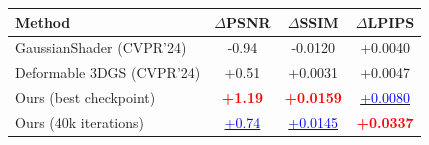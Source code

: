 \newcommand{\best}[1]{{\textbf{\textcolor{red}{#1}}}}
\newcommand{\second}[1]{{\underline{\textcolor{blue}{#1}}}}

\begin{table}[ht]
\vspace{-1.5mm}
\centering
\footnotesize
\label{tab:improve}
\vspace{-2mm}
\begin{tabular}{lccc}
\toprule
Method & $\Delta$PSNR  & $\Delta$SSIM  & $\Delta$LPIPS  \\
\midrule
GaussianShader (CVPR'24)&-0.94 &-0.0120 &+0.0040 \\
Deformable 3DGS (CVPR'24)&+0.51 &+0.0031 &+0.0047 \\
Ours (best checkpoint)&\best{+1.19} &\best{+0.0159} &\second{+0.0080}\\
Ours (40k iterations)&\second{+0.74} &\second{+0.0145} &\best{+0.0337}\\
\bottomrule
\end{tabular}
\vspace{-4mm}
\end{table}